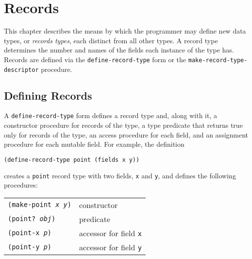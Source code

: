 \chapter{Records\label{records_CHPTRECORDS}}
\label{records_g138}
\label{records_h0}
\begin{figure}[H]
\centering
\setlength{\fboxrule}{3pt}
\end{figure}
\clearpage





\label{records_s0}\label{records_s1}\label{records_s2}This chapter describes the means by which the programmer may define
new data types, or \textit{records types}, each distinct from all other
types.
A record type determines the number and names of the fields each instance
of the type has.
Records are defined via the \texttt{define-record-type} form or
the \texttt{make-record-type-descriptor} procedure.


\section{\label{records_g139}\label{records_h1}Defining Records\label{records_SECTRECORDDEFINITION}}



A \texttt{define-record-type} form defines a record type and, along with it,
a constructor procedure for
records of the type, a type predicate that returns true only for
records of the type, an access procedure for each field, and an
assignment procedure for each mutable field.  For example, the
definition


\texttt{(define-record-type point (fields x y))}

creates a \texttt{point} record type with two fields, \texttt{x}
and \texttt{y}, and defines the following procedures:


{\footnotesize
\begin{tabular}[H]{ll}

\texttt{(make-point \textit{x} \textit{y})}  &  constructor \\

\texttt{(point? \textit{obj})}  &  predicate \\

\texttt{(point-x \textit{p})}  &  accessor for field \texttt{x} \\

\texttt{(point-y \textit{p})}  &  accessor for field \texttt{y}
 \\
\end{tabular}
}



